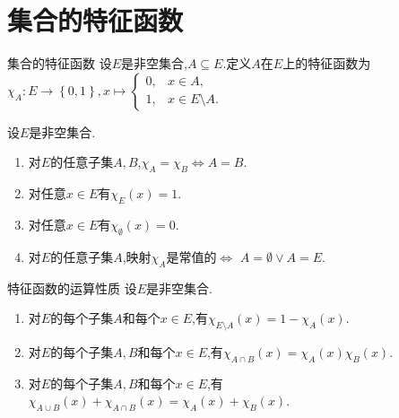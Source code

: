 \section{集合的特征函数}

\begin{definition}{集合的特征函数}{}
	设$E$是非空集合,$A\subseteq E$.定义$A$在$E$上的特征函数为$\chi_{A}:E\to\left\{0,1\right\},x\mapsto
	\begin{cases}
		0,&x\in A,\\
		1,&x\in E\setminus A.
	\end{cases}$
\end{definition}

\begin{proposition}{}{}
	设$E$是非空集合.
	\begin{enumerate}
		\item 对$E$的任意子集$A,B$,$\chi_{A}=\chi_{B}\iff A=B$.
		\item 对任意$x\in E$有$\chi_{E}\left(x\right)=1$.
		\item 对任意$x\in E$有$\chi_{\emptyset}\left(x\right)=0$.
		\item 对$E$的任意子集$A$,映射$\chi_{A}$是常值的$\iff$ $A=\emptyset\vee A=E$.
	\end{enumerate}
\end{proposition}

\begin{proposition}{特征函数的运算性质}{}
	设$E$是非空集合.
	\begin{enumerate}
		\item 对$E$的每个子集$A$和每个$x\in E$,有$\chi_{E\setminus A}\left(x\right)=1-\chi_{A}\left(x\right)$.
		\item 对$E$的每个子集$A,B$和每个$x\in E$,有$\chi_{A\cap B}\left(x\right)=\chi_{A}\left(x\right)\chi_{B}\left(x\right)$.
		\item 对$E$的每个子集$A,B$和每个$x\in E$,有$\chi_{A\cup B}\left(x\right)+\chi_{A\cap B}\left(x\right)=\chi_{A}\left(x\right)+\chi_{B}\left(x\right)$.
	\end{enumerate}
\end{proposition}


































